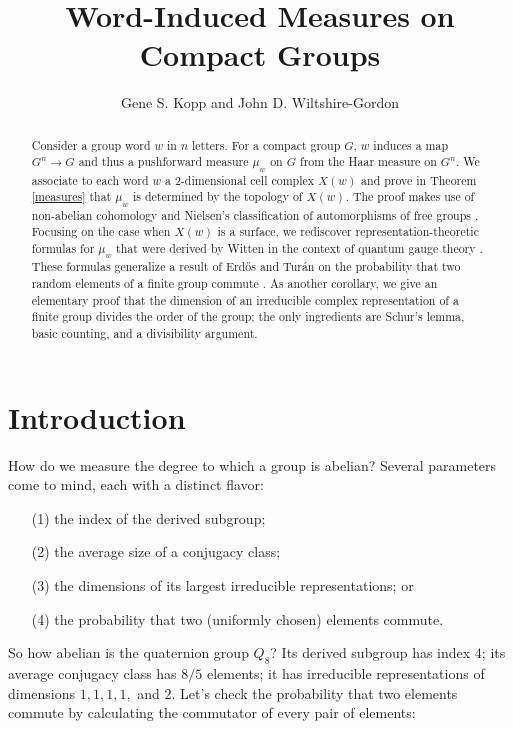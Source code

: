 \documentclass[12pt]{article}
\begin{document}
\title{Word-Induced Measures on Compact Groups}
\author{Gene S. Kopp and John D. Wiltshire-Gordon}
\maketitle
\begin{abstract}
Consider a group word $w$ in $n$ letters.  For a compact group $G$, $w$ induces a map $G^n \to G$ and thus a pushforward measure $\mu_w$ on $G$ from the Haar measure on $G^n$.  We associate to each word $w$ a $2$-dimensional cell complex $X(w)$ and prove in Theorem \ref{measures} that $\mu_w$ is determined by the topology of $X(w)$.  The proof makes use of non-abelian cohomology and Nielsen's classification of automorphisms of free groups \cite{nielsen}.  Focusing on the case when $X(w)$ is a surface, we rediscover representation-theoretic formulas for $\mu_w$ that were derived by Witten in the context of quantum gauge theory \cite{witten}.  These formulas generalize a result of Erd\H{o}s and Tur\'{a}n on the probability that two random elements of a finite group commute \cite{erdos}.  As another corollary, we give an elementary proof that the dimension of an irreducible complex representation of a finite group divides the order of the group; the only ingredients are Schur's lemma, basic counting, and a divisibility argument.
\end{abstract}

\section{Introduction}

How do we measure the degree to which a group is abelian?  Several parameters come to mind, each with a distinct flavor: 
\begin{itemize}
\item[(1)] the index of the derived subgroup;
\item[(2)] the average size of a conjugacy class;
\item[(3)] the dimensions of its largest irreducible representations; or
\item[(4)] the probability that two (uniformly chosen) elements commute.
\end{itemize}

\noindent So how abelian is the quaternion group $Q_8$?  Its derived subgroup has index $4$; its average conjugacy class has $8/5$ elements; it has irreducible representations of dimensions $1,1,1,1,$ and $2$.  Let's check the probability that two elements commute by calculating the commutator of every pair of elements:
\end{document}
